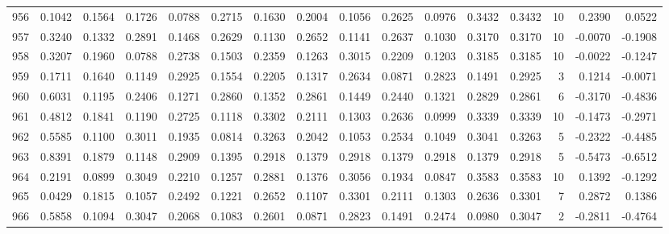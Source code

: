 \begin{tabular}{lrrrrrrrrrrrrrrr}
956 &      0.1042 &  0.1564 &  0.1726 &  0.0788 &  0.2715 &  0.1630 &  0.2004 &  0.1056 &  0.2625 &  0.0976 &   0.3432 &     0.3432 &     10 &                    0.2390 &                     0.0522 \\
957 &      0.3240 &  0.1332 &  0.2891 &  0.1468 &  0.2629 &  0.1130 &  0.2652 &  0.1141 &  0.2637 &  0.1030 &   0.3170 &     0.3170 &     10 &                   -0.0070 &                    -0.1908 \\
958 &      0.3207 &  0.1960 &  0.0788 &  0.2738 &  0.1503 &  0.2359 &  0.1263 &  0.3015 &  0.2209 &  0.1203 &   0.3185 &     0.3185 &     10 &                   -0.0022 &                    -0.1247 \\
959 &      0.1711 &  0.1640 &  0.1149 &  0.2925 &  0.1554 &  0.2205 &  0.1317 &  0.2634 &  0.0871 &  0.2823 &   0.1491 &     0.2925 &      3 &                    0.1214 &                    -0.0071 \\
960 &      0.6031 &  0.1195 &  0.2406 &  0.1271 &  0.2860 &  0.1352 &  0.2861 &  0.1449 &  0.2440 &  0.1321 &   0.2829 &     0.2861 &      6 &                   -0.3170 &                    -0.4836 \\
961 &      0.4812 &  0.1841 &  0.1190 &  0.2725 &  0.1118 &  0.3302 &  0.2111 &  0.1303 &  0.2636 &  0.0999 &   0.3339 &     0.3339 &     10 &                   -0.1473 &                    -0.2971 \\
962 &      0.5585 &  0.1100 &  0.3011 &  0.1935 &  0.0814 &  0.3263 &  0.2042 &  0.1053 &  0.2534 &  0.1049 &   0.3041 &     0.3263 &      5 &                   -0.2322 &                    -0.4485 \\
963 &      0.8391 &  0.1879 &  0.1148 &  0.2909 &  0.1395 &  0.2918 &  0.1379 &  0.2918 &  0.1379 &  0.2918 &   0.1379 &     0.2918 &      5 &                   -0.5473 &                    -0.6512 \\
964 &      0.2191 &  0.0899 &  0.3049 &  0.2210 &  0.1257 &  0.2881 &  0.1376 &  0.3056 &  0.1934 &  0.0847 &   0.3583 &     0.3583 &     10 &                    0.1392 &                    -0.1292 \\
965 &      0.0429 &  0.1815 &  0.1057 &  0.2492 &  0.1221 &  0.2652 &  0.1107 &  0.3301 &  0.2111 &  0.1303 &   0.2636 &     0.3301 &      7 &                    0.2872 &                     0.1386 \\
966 &      0.5858 &  0.1094 &  0.3047 &  0.2068 &  0.1083 &  0.2601 &  0.0871 &  0.2823 &  0.1491 &  0.2474 &   0.0980 &     0.3047 &      2 &                   -0.2811 &                    -0.4764 \\

\end{tabular}
